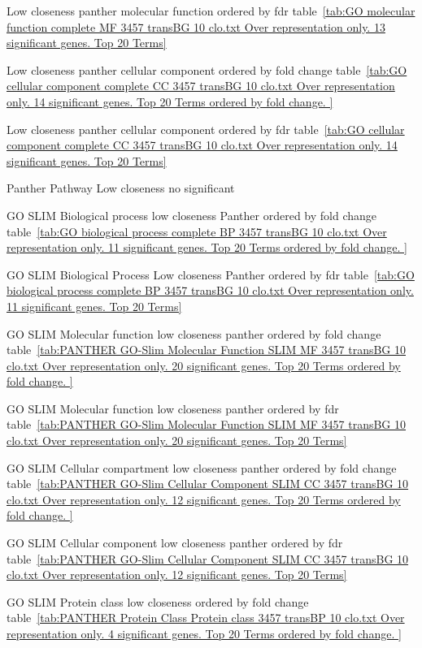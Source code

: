 Low closeness panther molecular function ordered by fdr table~\ref{tab:GO molecular function complete MF 3457 transBG 10 clo.txt Over representation only. 13 significant genes. Top 20 Terms}

Low closeness panther cellular component ordered by fold change table~\ref{tab:GO cellular component complete CC 3457 transBG 10 clo.txt Over representation only. 14 significant genes. Top 20 Terms ordered by fold change. }


Low closeness panther cellular component ordered by fdr table~\ref{tab:GO cellular component complete CC 3457 transBG 10 clo.txt Over representation only. 14 significant genes. Top 20 Terms}

Panther Pathway Low closeness no significant

GO SLIM Biological process low closeness Panther ordered by fold change table~\ref{tab:GO biological process complete BP 3457 transBG 10 clo.txt Over representation only. 11 significant genes. Top 20 Terms ordered by fold change. }


GO SLIM Biological Process Low closeness Panther ordered by fdr table~\ref{tab:GO biological process complete BP 3457 transBG 10 clo.txt Over representation only. 11 significant genes. Top 20 Terms}




GO SLIM Molecular function low closeness panther ordered by fold change table~\ref{tab:PANTHER GO-Slim Molecular Function SLIM MF 3457 transBG 10 clo.txt Over representation only. 20 significant genes. Top 20 Terms ordered by fold change. }


GO SLIM Molecular function low closeness panther ordered by fdr table~\ref{tab:PANTHER GO-Slim Molecular Function SLIM MF 3457 transBG 10 clo.txt Over representation only. 20 significant genes. Top 20 Terms}

GO SLIM Cellular compartment low closeness panther ordered by fold change table~\ref{tab:PANTHER GO-Slim Cellular Component SLIM CC 3457 transBG 10 clo.txt Over representation only. 12 significant genes. Top 20 Terms ordered by fold change. }

GO SLIM Cellular component low closeness panther ordered by fdr table~\ref{tab:PANTHER GO-Slim Cellular Component SLIM CC 3457 transBG 10 clo.txt Over representation only. 12 significant genes. Top 20 Terms}




GO SLIM Protein class low closeness ordered by fold change table~\ref{tab:PANTHER Protein Class Protein class 3457 transBP 10 clo.txt Over representation only. 4 significant genes. Top 20 Terms ordered by fold change. }

